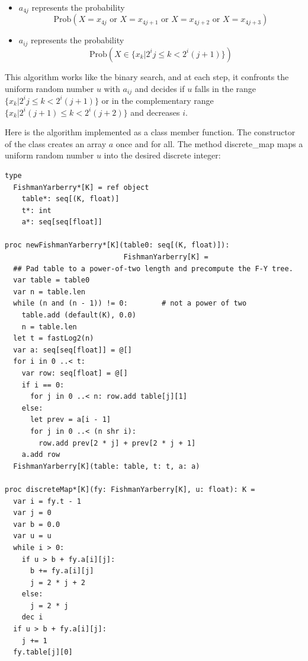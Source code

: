 \documentclass[justified, sixbynine]{tufte-book}
\theoremstyle{plain}%
\newtheorem * {corollary}{Corollary}
\theoremstyle{definition}
\theoremstyle{remark}
\newtheorem * {remark}{Remark}
\newtheorem * {note}{Note}
\begin{document}
\begin{fullwidth}
\begin{itemize}
\item  $a_{4j}$ represents the probability
\begin{equation}
\textrm{Prob}(X=x_{4j}\text{ or }X=x_{4j+1}\text{ or }X=x_{4j+2}\text{ or }X=x_{4j+3})
\end{equation}

\item  $a_{ij}$ represents the probability
\begin{equation}
\textrm{Prob}(X\in \{x_k|2^ij\leq k<2^i(j+1)\})
\end{equation}
\end{itemize}

This algorithm works like the binary search, and at each step, it confronts the
uniform random number $u$ with $a_{ij}$ and decides if $u$ falls in the
range $\{x_k|2^ij\leq k<2^i(j+1)\}$ or in the complementary range $%
\{x_k|2^i(j+1)\leq k<2^i(j+2)\}$ and decreases $i.$

Here is the algorithm implemented as a class member function. The
constructor of the class creates an array $a$ once and for all. The method
discrete\_map maps a uniform random number $u$ into the desired discrete
integer:


\begin{lstlisting}
type
  FishmanYarberry*[K] = ref object
    table*: seq[(K, float)]
    t*: int
    a*: seq[seq[float]]

proc newFishmanYarberry*[K](table0: seq[(K, float)]):
                            FishmanYarberry[K] =
  ## Pad table to a power-of-two length and precompute the F-Y tree.
  var table = table0
  var n = table.len
  while (n and (n - 1)) != 0:        # not a power of two
    table.add (default(K), 0.0)
    n = table.len
  let t = fastLog2(n)
  var a: seq[seq[float]] = @[]
  for i in 0 ..< t:
    var row: seq[float] = @[]
    if i == 0:
      for j in 0 ..< n: row.add table[j][1]
    else:
      let prev = a[i - 1]
      for j in 0 ..< (n shr i):
        row.add prev[2 * j] + prev[2 * j + 1]
    a.add row
  FishmanYarberry[K](table: table, t: t, a: a)

proc discreteMap*[K](fy: FishmanYarberry[K], u: float): K =
  var i = fy.t - 1
  var j = 0
  var b = 0.0
  var u = u
  while i > 0:
    if u > b + fy.a[i][j]:
      b += fy.a[i][j]
      j = 2 * j + 2
    else:
      j = 2 * j
    dec i
  if u > b + fy.a[i][j]:
    j += 1
  fy.table[j][0]
\end{lstlisting}



\end{fullwidth}
\end{document}

